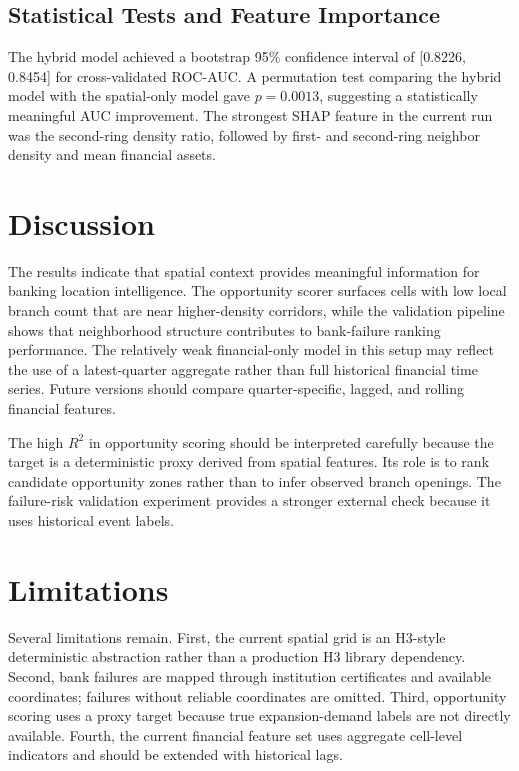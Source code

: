 \documentclass[conference]{IEEEtran}
\begin{document}
\subsection{Statistical Tests and Feature Importance}
The hybrid model achieved a bootstrap 95\% confidence interval of
[0.8226, 0.8454] for cross-validated ROC-AUC. A permutation test comparing
the hybrid model with the spatial-only model gave $p=0.0013$, suggesting a
statistically meaningful AUC improvement. The strongest SHAP feature in the
current run was the second-ring density ratio, followed by first- and
second-ring neighbor density and mean financial assets.

\section{Discussion}
The results indicate that spatial context provides meaningful information
for banking location intelligence. The opportunity scorer surfaces cells
with low local branch count that are near higher-density corridors, while
the validation pipeline shows that neighborhood structure contributes to
bank-failure ranking performance. The relatively weak financial-only model
in this setup may reflect the use of a latest-quarter aggregate rather than
full historical financial time series. Future versions should compare
quarter-specific, lagged, and rolling financial features.

The high $R^2$ in opportunity scoring should be interpreted carefully because
the target is a deterministic proxy derived from spatial features. Its role
is to rank candidate opportunity zones rather than to infer observed branch
openings. The failure-risk validation experiment provides a stronger
external check because it uses historical event labels.

\section{Limitations}
Several limitations remain. First, the current spatial grid is an H3-style
deterministic abstraction rather than a production H3 library dependency.
Second, bank failures are mapped through institution certificates and
available coordinates; failures without reliable coordinates are omitted.
Third, opportunity scoring uses a proxy target because true expansion-demand
labels are not directly available. Fourth, the current financial feature set
uses aggregate cell-level indicators and should be extended with historical
lags.
\end{document}
